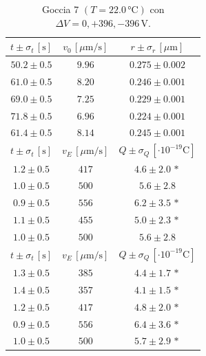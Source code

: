 \documentclass[]{article}
\begin{document}
    \begin{table}[H]
        \centering
        \begin{tabular}{||c|c|c||}
            \hline
            $t \pm \sigma_t \, \left[\text{s}\right]$ & $v_0 \, \left[\mu\text{m/s}\right]$ & $r \pm \sigma_r \, \left[\mu\text{m}\right]$ \\\hline
            \hline
            $50.2 \pm 0.5$ & $9.96$ & $0.275 \pm 0.002$ \\\hline
            $61.0 \pm 0.5$ & $8.20$ & $0.246 \pm 0.001$ \\\hline
            $69.0 \pm 0.5$ & $7.25$ & $0.229 \pm 0.001$ \\\hline
            $71.8 \pm 0.5$ & $6.96$ & $0.224 \pm 0.001$ \\\hline
            $61.4 \pm 0.5$ & $8.14$ & $0.245 \pm 0.001$ \\\hline
            \hline
            $t \pm \sigma_t \, \left[\text{s}\right]$ & $v_E \, \left[\mu\text{m/s}\right]$ & $Q \pm \sigma_Q \, \left[\cdot 10^{-19} \text{C}\right]$ \\\hline
            \hline
            $1.2 \pm 0.5$ & $417$ & $4.6 \pm 2.0\,\ast$ \\\hline
            $1.0 \pm 0.5$ & $500$ & $5.6 \pm 2.8$ \\\hline
            $0.9 \pm 0.5$ & $556$ & $6.2 \pm 3.5\,\ast$ \\\hline
            $1.1 \pm 0.5$ & $455$ & $5.0 \pm 2.3\,\ast$ \\\hline
            $1.0 \pm 0.5$ & $500$ & $5.6 \pm 2.8$ \\\hline
            \hline
            $t \pm \sigma_t \, \left[\text{s}\right]$ & $v_E \, \left[\mu\text{m/s}\right]$ & $Q \pm \sigma_Q \, \left[\cdot 10^{-19} \text{C}\right]$ \\\hline
            \hline
            $1.3 \pm 0.5$ & $385$ & $4.4 \pm 1.7\,\ast$ \\\hline
            $1.4 \pm 0.5$ & $357$ & $4.1 \pm 1.5\,\ast$ \\\hline
            $1.2 \pm 0.5$ & $417$ & $4.8 \pm 2.0\,\ast$ \\\hline
            $0.9 \pm 0.5$ & $556$ & $6.4 \pm 3.6\,\ast$ \\\hline
            $1.0 \pm 0.5$ & $500$ & $5.7 \pm 2.9\,\ast$ \\\hline
        \end{tabular}
        \caption{Goccia 7 $\left(T = 22.0\, \text{°C}\right)$ con $\Delta V = 0,+396,-396 \,\text{V}$.}
        \label{goccia-7}
    \end{table}
\end{document}
